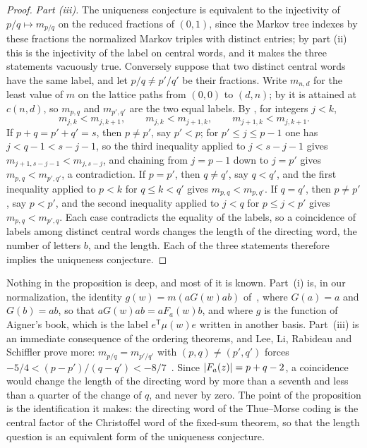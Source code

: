 \begin{proof}
\emph{Part (iii).} The uniqueness conjecture is equivalent to the injectivity of $p/q\mapsto m_{p/q}$
on the reduced fractions of $(0,1)$, since the Markov tree indexes by these fractions the
normalized Markov triples with distinct entries; by part (ii) this is the injectivity of the label
on central words, and it makes the three statements vacuously true. Conversely suppose that two
distinct central words have the same label, and let $p/q\neq p'/q'$ be their fractions. Write
$m_{n,d}$ for the least value of $m$ on the lattice paths from $(0,0)$ to $(d,n)$; by
\cite[Proposition~21]{LagisquetEtAl2021} it is attained at $c(n,d)$, so $m_{p,q}$ and
$m_{p',q'}$ are the two equal labels. By \cite[Theorem~2]{LagisquetEtAl2021}, for integers $j<k$,
$$
 m_{j,k}<m_{j,k+1},\qquad m_{j,k}<m_{j+1,k},\qquad m_{j+1,k}<m_{j,k+1}.
$$
If $p+q=p'+q'=s$, then $p\neq p'$, say $p'<p$; for $p'\leqslant j\leqslant p-1$ one has
$j<q-1<s-j-1$, so the third inequality applied to $j<s-j-1$ gives $m_{j+1,s-j-1}<m_{j,s-j}$, and
chaining from $j=p-1$ down to $j=p'$ gives $m_{p,q}<m_{p',q'}$, a contradiction. If $p=p'$, then
$q\neq q'$, say $q<q'$, and the first inequality applied to $p<k$ for $q\leqslant k<q'$ gives
$m_{p,q}<m_{p,q'}$. If $q=q'$, then $p\neq p'$, say $p<p'$, and the second inequality applied to
$j<q$ for $p\leqslant j<p'$ gives $m_{p,q}<m_{p',q}$. Each case contradicts the equality of the
labels, so a coincidence of labels among distinct central words changes the length of the
directing word, the number of letters $b$, and the length. Each of the three statements therefore
implies the uniqueness conjecture.
\end{proof}

Nothing in the proposition is deep, and most of it is known. Part~(i) is, in our normalization,
the identity $g(w)=m(aG(w)ab)$ of~\cite[Appendix~B]{LagisquetEtAl2021}, where $G(a)=a$ and $G(b)=ab$,
so that $aG(w)ab=aF_a(w)b$, and where $g$ is the function of Aigner's book, which is the label
$e^{\mathsf T}\mu(w)e$ written in another basis. Part~(iii) is an immediate consequence of the
ordering theorems, and Lee, Li, Rabideau and Schiffler prove more: $m_{p/q}=m_{p'/q'}$ with
$(p,q)\neq(p',q')$ forces $-5/4<(p-p')/(q-q')<-8/7$~\cite[Corollary~1.5]{LeeEtAl2023}. Since
$\lvert F_a(z)\rvert=p+q-2$, a coincidence would change the length of the directing word by more than a
seventh and less than a quarter of the change of $q$, and never by zero. The point of the proposition
is the identification it makes: the directing word of the Thue--Morse coding is the central factor of
the Christoffel word of the fixed-sum theorem, so that the length question is an equivalent form of
the uniqueness conjecture.

